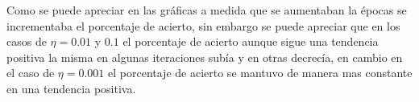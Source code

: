 \documentclass{article}
\theoremstyle{mytheoremstyle}
\theoremstyle{mytheoremstyle}
\theoremstyle{myproblemstyle}
\begin{document}
Como se puede apreciar en las gráficas a medida que se aumentaban la épocas se incrementaba el porcentaje de acierto, sin embargo se puede apreciar que en los casos de $\eta = 0.01$ y $0.1$ el porcentaje de acierto aunque sigue una tendencia positiva la misma en algunas iteraciones subía y en otras decrecía, en cambio en el caso de $\eta = 0.001$ el porcentaje de acierto se mantuvo de manera mas constante en una tendencia positiva.
\end{document}
